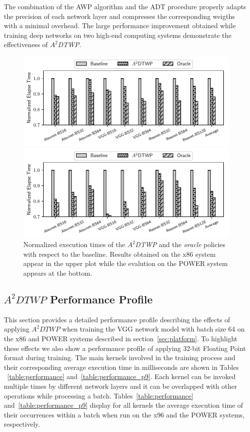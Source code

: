 The combination of the AWP algorithm and the ADT procedure properly adapts the precision of each network layer and compresses the corresponding weigths with a minimal overhead.
The large performance improvement obtained while training deep networks on two high-end computing systems demonstrate the effectiveness of \textit{$A^2$DTWP}.

\begin{figure}%
    \centerline{\includegraphics[scale=0.85]{bitpack/figs/all_bars.pdf}}
    \centerline{\includegraphics[scale=0.85]{bitpack/figs/all_bars_p9.pdf}}
    \caption{Normalized execution times of the \textit{$A^2$DTWP} and the \textit{oracle} policies with respect to the baseline. 
Results obtained on the x86 system appear in the upper plot while the evalution on the POWER system appears at the bottom.} 
    \label{fig:all}
\end{figure}

\subsection{$A^2DTWP$ Performance Profile}
\label{sec:performance}
This section provides a detailed performance profile describing the effects of 
applying $A^2DTWP$ when training the VGG network model with batch size 64 on the x86 and POWER systems described in section~\ref{sec:platform}.
To highlight these effects we also show a performance profile of applying 32-bit 
Floating Point format during training.
The main kernels involved in the training process and their corresponding average execution time in milliseconds are shown in Tables ~\ref{table:performance} and~\ref{table:performance_p9}.
Each kernel can be invoked multiple times by different network layers and it can be overlapped with other operations while processing a batch.
Tables~\ref{table:performance} and~\ref{table:performance_p9} display for all kernels the average execution time of their occurrences within a batch when run on the x96 and the POWER systems, respectively.

